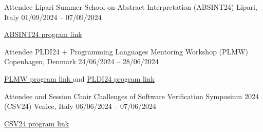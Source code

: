 
\begin{cventries}

    \cventry
        {Attendee} %
        {Lipari Summer School on Abstract Interpretation (ABSINT24)} %
        {Lipari, Italy} %
        {01/09/2024 – 07/09/2024} %
        {
        \begin{cvitems} %
            \item {\href{https://drive.google.com/file/d/1uhLXjf0C\_OeptfQwxXwk\_3T8aFOkDMYC/view?pli=1}{ABSINT24 program link }}
        \end{cvitems}
        }

    \cventry
        {Attendee} %
        {PLDI24 + Programming Languages Mentoring Workshop (PLMW)} %
        {Copenhagen, Denmark} %
        {24/06/2024 – 28/06/2024} %
        {
        \begin{cvitems} %
            \item {\href{https://pldi24.sigplan.org/track/PLMW-PLDI-2024\#program}{PLMW program link }
            and \href{https://pldi24.sigplan.org/program/program-pldi-2024/}{PLDI24 program link }}
        \end{cvitems}
        }

    \vspace{-.7em}  %
    \hspace*{-.4em} %

    \cventry
        {Attendee and Session Chair} %
        {Challenges of Software Verification Symposium 2024 (CSV24)} %
        {Venice, Italy} %
        {06/06/2024 – 07/06/2024} %
        {
        \begin{cvitems} %
            \item {\href{https://unive-ssv.github.io/events/2024/06/06/csv.html}{CSV24 program link }}
        \end{cvitems}
        }
\end{cventries}
